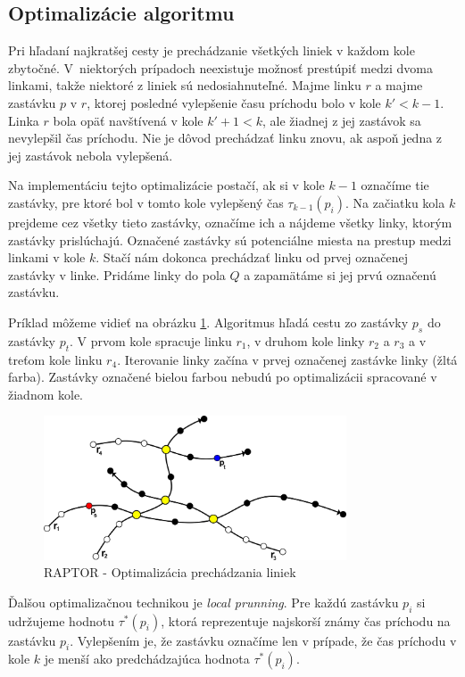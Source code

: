 \subsection{Optimalizácie algoritmu}
\label{sub:raptor-optimalisation}
Pri hľadaní najkratšej cesty je prechádzanie všetkých liniek v každom kole zbytočné. V~niektorých prípadoch neexistuje možnosť prestúpiť medzi dvoma linkami, takže niektoré z liniek sú nedosiahnuteľné. Majme linku $r$ a majme zastávku $p$ v $r$, ktorej posledné vylepšenie času príchodu bolo v kole $k' < k-1$. Linka $r$ bola opäť navštívená v kole $k'+1 < k$, ale žiadnej z jej zastávok sa nevylepšil čas príchodu. Nie je dôvod prechádzať linku znovu, ak aspoň jedna z jej zastávok nebola vylepšená. 

Na implementáciu tejto optimalizácie postačí, ak si v kole $k-1$ označíme tie zastávky, pre ktoré bol v tomto kole vylepšený čas $\tau_{k-1}(p_i)$. Na začiatku kola $k$ prejdeme cez všetky tieto zastávky, označíme ich a nájdeme všetky linky, ktorým zastávky prislúchajú. Označené zastávky sú potenciálne miesta na prestup medzi linkami v kole $k$. Stačí nám dokonca prechádzať linku od prvej označenej zastávky v linke. Pridáme linky do pola $Q$ a zapamätáme si jej prvú označenú zastávku. 

Príklad môžeme vidieť na obrázku \ref{fig:raptor-optimal}. Algoritmus hľadá cestu zo zastávky $p_s$ do zastávky $p_t$. V prvom kole spracuje linku $r_1$, v druhom kole linky $r_2$ a $r_3$ a v treťom kole linku $r_4$. Iterovanie linky začína v prvej označenej zastávke linky (žltá farba). Zastávky označené bielou farbou nebudú po optimalizácii spracované v žiadnom kole. 

\begin{figure}[H]
\centerline{\includegraphics[width=0.8\textwidth]{images/raptor-optimal}}
\caption[RAPTOR - Optimalizácia prechádzania liniek]{RAPTOR - Optimalizácia prechádzania liniek}
\label{fig:raptor-optimal}
\end{figure}

Ďalšou optimalizačnou technikou je \textit{local prunning}. Pre každú zastávku $p_i$ si udržujeme hodnotu $\tau^*(p_i)$, ktorá reprezentuje najskorší známy čas príchodu na zastávku $p_i$. Vylepšením je, že zastávku označíme len v prípade, že čas príchodu v kole $k$ je menší ako predchádzajúca hodnota $\tau^*(p_i)$. 

